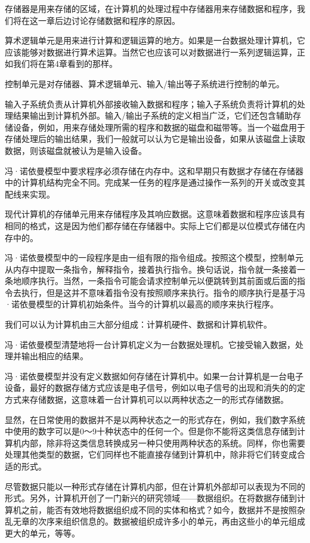 存储器是用来存储的区域，在计算机的处理过程中存储器用来存储数据和程序，我们将在这一章后边讨论存储数据和程序的原因。

算术逻辑单元是用来进行计算和逻辑运算的地方。如果是一台数据处理计算机，它应该能够对数据进行算术运算。当然它也应该可以对数据进行一系列逻辑运算，正如我们将在第4章看到的那样。

控制单元是对存储器、算术逻辑单元、输入/输出等子系统进行控制的单元。

输入子系统负责从计算机外部接收输入数据和程序；输入子系统负责将计算机的处理结果输出到计算机外部。输入/输出子系统的定义相当广泛，它们还包含辅助存储设备，例如，用来存储处理所需的程序和数据的磁盘和磁带等。当一个磁盘用于存储处理后的输出结果，我们一般就可以认为它是输出设备，如果从该磁盘上读取数据，则该磁盘就被认为是输入设备。

冯·诺依曼模型中要求程序必须存储在内存中。这和早期只有数据才存储在存储器中的计算机结构完全不同。完成某一任务的程序是通过操作一系列的开关或改变其配线来实现。

现代计算机的存储单元用来存储程序及其响应数据。这意味着数据和程序应该具有相同的格式，这是因为他们都存储在存储器中。实际上它们都是以位模式存储在内存中的。

冯·诺依曼模型中的一段程序是由一组有限的指令组成。按照这个模型，控制单元从内存中提取一条指令，解释指令，接着执行指令。换句话说，指令就一条接着一条地顺序执行。当然，一条指令可能会请求控制单元以便跳转到其前面或后面的指令去执行，但是这并不意味着指令没有按照顺序来执行。指令的顺序执行是基于冯·诺依曼模型的计算机初始条件。当今的计算机以最高的顺序来执行程序。

我们可以认为计算机由三大部分组成：计算机硬件、数据和计算机软件。

冯·诺依曼模型清楚地将一台计算机定义为一台数据处理机。它接受输入数据，处理并输出相应的结果。

冯·诺依曼模型并没有定义数据如何存储在计算机中。如果一台计算机是一台电子设备，最好的数据存储方式应该是电子信号，例如以电子信号的出现和消失的的定方式来存储数据，这意味着一台计算机可以以两种状态之一的形式存储数据。

显然，在日常使用的数据并不是以两种状态之一的形式存在，例如，我们数字系统中使用的数字可以是0～9十种状态中的任何一个。但是你不能将这类信息存储到计算机内部，除非将这类信息转换成另一种只使用两种状态的系统。同样，你也需要处理其他类型的数据，它们同样也不能直接存储到计算机中，除非将它们转变成合适的形式。

尽管数据只能以一种形式存储在计算机内部，但在计算机外部却可以表现为不同的形式。另外，计算机开创了一门新兴的研究领域——数据组织。在将数据存储到计算机之前，能否有效地将数据组织成不同的实体和格式？如今，数据并不是按照杂乱无章的次序来组织信息的。数据被组织成许多小的单元，再由这些小的单元组成更大的单元，等等。

